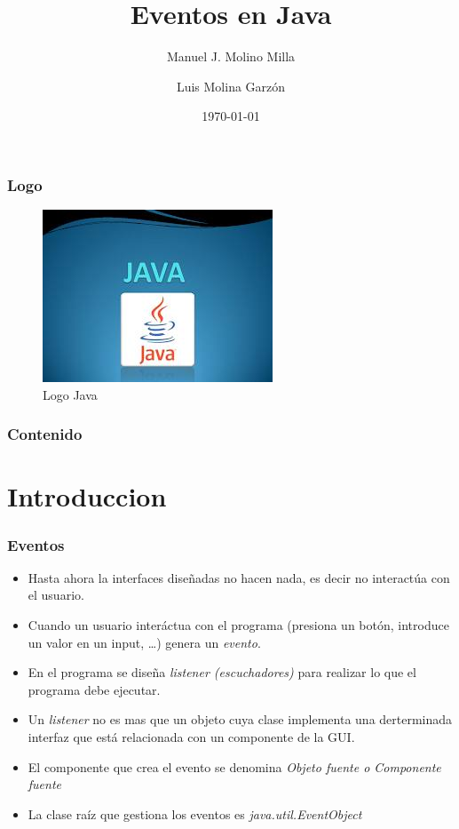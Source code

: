 \documentclass{beamer}
\title{Eventos en Java}
\author{Manuel J. Molino Milla \and Luis Molina Garzón}
\date{\today} %
\institute{IES Virgen del Carmen \and Departamento de Informática}
\begin{document}
\begin{frame}
  \titlepage
\end{frame}

\begin{frame}
    \frametitle{Logo}
\begin{figure}
\includegraphics[scale=1]{imagenes/logo.jpeg} 
\caption{Logo Java}
\end{figure}
\end{frame}

\begin{frame}
  \frametitle{Contenido}
  \tableofcontents[pausesections]
\end{frame}



\section{Introduccion}

\begin{frame}
\frametitle{Eventos}\begin{itemize}[<+->]
\item Hasta ahora la interfaces diseñadas no hacen nada, es decir no interactúa con el usuario.
\item Cuando un usuario interáctua con el programa (presiona un botón, introduce un valor en un input, \dots) genera un \emph{evento}.
\item En el programa se diseña \emph{listener (escuchadores)} para realizar lo que el programa debe ejecutar.
\item Un \emph{listener} no es mas que un objeto cuya clase  implementa una derterminada interfaz que está relacionada con un componente de la GUI.
\item El componente que crea el evento se denomina \emph{Objeto fuente o Componente fuente}
\item La clase raíz que gestiona los eventos es \emph{java.util.EventObject}
\end{itemize}
\end{frame}
\end{document}
